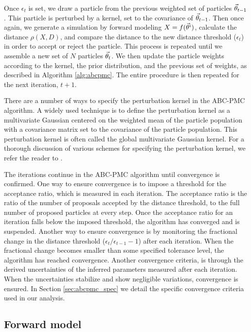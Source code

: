 Once $\epsilon_t$ is set, we draw a particle from the previous 
weighted set of particles ${\vec{\theta}}_{t-1}$. 
This particle is perturbed by a kernel, set to the covariance of ${\vec{\theta}}_{t-1}$.
Then once again, we generate a simulation by forward modeling $X = f(\vec{\theta}^i)$, 
calculate the distance $\rho(X, D)$, and compare the distance to the new distance 
threshold ($\epsilon_t$) in order to accept or reject the particle. This process is 
repeated until we assemble a new set of $N$ particles ${\vec{\theta}}_t$. We then update the 
particle weights according to the kernel, the prior distribution, and the 
previous set of weights, as described in Algorithm \ref{alg:abcpmc}. The 
entire procedure is then repeated for the next iteration, $t+1$.

There are a number of ways to specify the perturbation kernel in the ABC-PMC algorithm. 
A widely used technique is to define the perturbation kernel as a multivariate Gaussian 
centered on the weighted mean of the particle population with a covariance matrix set to 
the covariance of the particle population. This perturbation kernel is often called the 
global multivariate Gaussian kernel. For a thorough discussion of various schemes for 
specifying the perturbation kernel, we refer the reader to \citealt{optimalkernel}. 

The iterations continue in the ABC-PMC algorithm until convergence is confirmed. 
One way to ensure convergence is to impose a threshold for the acceptance ratio, 
which is measured in each iteration. The acceptance ratio is the ratio of the number 
of proposals accepted by the distance threshold, to the full number 
of proposed particles at every step. Once the acceptance ratio for 
an iteration falls below the imposed threshold, the algorithm has converged and is
suspended. Another way to ensure convergence is by monitoring the fractional change in 
the distance threshold ($\epsilon_t/\epsilon_{t-1} - 1$)
after each iteration. When the fractional change becomes smaller than some 
specified tolerance level, the algorithm has reached convergence. Another 
convergence criteria, is through the derived uncertainties of the inferred
parameters measured after each iteration. When the uncertainties stabilize 
and show negligible variations, convergence is ensured. In Section \ref{sec:abcpmc_spec} 
we detail the specific convergence criteria used in our analysis. 

\subsection{Forward model}\label{sec:forwardmodel}
